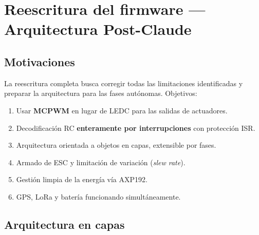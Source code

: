 \documentclass[12pt,a4paper]{article}
\begin{document}
\section{Reescritura del firmware --- Arquitectura Post-Claude}

\subsection{Motivaciones}

La reescritura completa busca corregir todas las limitaciones identificadas y
preparar la arquitectura para las fases aut\'onomas. Objetivos:

\begin{enumerate}
  \item Usar \textbf{MCPWM} en lugar de LEDC para las salidas de actuadores.
  \item Decodificaci\'on RC \textbf{enteramente por interrupciones} con protecci\'on ISR.
  \item Arquitectura orientada a objetos en capas, extensible por fases.
  \item Armado de ESC y limitaci\'on de variaci\'on (\emph{slew rate}).
  \item Gesti\'on limpia de la energ\'ia v\'ia AXP192.
  \item GPS, LoRa y bater\'ia funcionando simult\'aneamente.
\end{enumerate}

\subsection{Arquitectura en capas}
\end{document}
